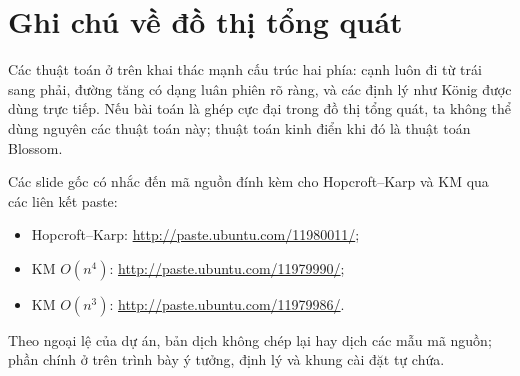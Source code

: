 \documentclass[11pt]{article}
\begin{document}
\section{Ghi chú về đồ thị tổng quát}

Các thuật toán ở trên khai thác mạnh cấu trúc hai phía: cạnh luôn đi từ trái
sang phải, đường tăng có dạng luân phiên rõ ràng, và các định lý như König
được dùng trực tiếp. Nếu bài toán là ghép cực đại trong đồ thị tổng quát, ta
không thể dùng nguyên các thuật toán này; thuật toán kinh điển khi đó là
thuật toán Blossom.

Các slide gốc có nhắc đến mã nguồn đính kèm cho Hopcroft--Karp và KM qua các
liên kết paste:
\begin{itemize}
  \item Hopcroft--Karp: \url{http://paste.ubuntu.com/11980011/};
  \item KM \(O(n^4)\): \url{http://paste.ubuntu.com/11979990/};
  \item KM \(O(n^3)\): \url{http://paste.ubuntu.com/11979986/}.
\end{itemize}
Theo ngoại lệ của dự án, bản dịch không chép lại hay dịch các mẫu mã nguồn;
phần chính ở trên trình bày ý tưởng, định lý và khung cài đặt tự chứa.
\end{document}
